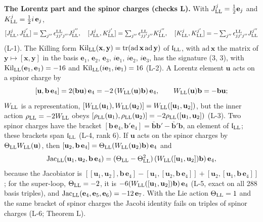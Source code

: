 \documentclass[
  10pt,
]{article}
\begin{document}
\textbf{The Lorentz part and the spinor charges (checks L).} With
\(J^j_{\rm LL}=\tfrac12\mathbf e_j\) and
\(K^j_{\rm LL}=\tfrac12 i\,\mathbf e_j\),
\[[J^j_{\rm LL},J^{j'}_{\rm LL}]=\textstyle\sum_{j''}\epsilon^{\rm LL}_{jj'j''}J^{j''}_{\rm LL},\quad [J^j_{\rm LL},K^{j'}_{\rm LL}]=\textstyle\sum_{j''}\epsilon^{\rm LL}_{jj'j''}K^{j''}_{\rm LL},\quad [K^j_{\rm LL},K^{j'}_{\rm LL}]=-\textstyle\sum_{j''}\epsilon^{\rm LL}_{jj'j''}J^{j''}_{\rm LL}\]
(L-1). The Killing form
\(\mathrm{Kil}_{\rm LL}(\mathbf x,\mathbf y)=\mathrm{tr}(\mathrm{ad}\,\mathbf x\,\mathrm{ad}\,\mathbf y)\)
of \(\mathfrak l_{\rm LL}\), with \(\mathrm{ad}\,\mathbf x\) the matrix
of \(\mathbf y\mapsto[\mathbf x,\mathbf y]\) in the basis
\(\mathbf e_1\), \(\mathbf e_2\), \(\mathbf e_3\), \(i\mathbf e_1\),
\(i\mathbf e_2\), \(i\mathbf e_3\), has the signature (3, 3), with
\(\mathrm{Kil}_{\rm LL}(\mathbf e_1,\mathbf e_1)=-16\) and
\(\mathrm{Kil}_{\rm LL}(i\mathbf e_1,i\mathbf e_1)=16\) (L-2). A Lorentz
element \(\mathbf u\) acts on a spinor charge by
\[[\mathbf u,\mathbf b\,\mathbf e_4]=2(\mathbf b\mathbf u)\,\mathbf e_4=-2\,(W_{\rm LL}(\mathbf u)\mathbf b)\,\mathbf e_4,\qquad W_{\rm LL}(\mathbf u)\mathbf b=-\mathbf b\mathbf u ;\]
\(W_{\rm LL}\) is a representation,
\([W_{\rm LL}(\mathbf u_1),W_{\rm LL}(\mathbf u_2)]=W_{\rm LL}([\mathbf u_1,\mathbf u_2])\),
but the inner action \(\rho_{\rm LL}=-2W_{\rm LL}\) obeys
\([\rho_{\rm LL}(\mathbf u_1),\rho_{\rm LL}(\mathbf u_2)]=-2\rho_{\rm LL}([\mathbf u_1,\mathbf u_2])\)
(L-3). Two spinor charges have the bracket
\([\mathbf b\,\mathbf e_4,\mathbf b'\mathbf e_4]=\bar{\mathbf b}\mathbf b'-\bar{\mathbf b}'\mathbf b\),
an element of \(\mathfrak l_{\rm LL}\); these brackets span
\(\mathfrak l_{\rm LL}\) (L-4, rank 6). If \(\mathbf u\) acts on the
spinor charges by \(\Theta_{\rm LL}W_{\rm LL}(\mathbf u)\), then
\([\mathbf u_2,\mathbf b\,\mathbf e_4]=\Theta_{\rm LL}(W_{\rm LL}(\mathbf u_2)\mathbf b)\,\mathbf e_4\)
and
\[\mathrm{Jac}_{\rm LL}(\mathbf u_1,\mathbf u_2,\mathbf b\,\mathbf e_4)=(\Theta_{\rm LL}-\Theta_{\rm LL}^2)\,(W_{\rm LL}([\mathbf u_1,\mathbf u_2])\mathbf b)\,\mathbf e_4 ,\]
because the Jacobiator is
\([[\mathbf u_1,\mathbf u_2],\mathbf b\,\mathbf e_4]-[\mathbf u_1,[\mathbf u_2,\mathbf b\,\mathbf e_4]]+[\mathbf u_2,[\mathbf u_1,\mathbf b\,\mathbf e_4]]\);
for the super-loop, \(\Theta_{\rm LL}=-2\), it is
\(-6(W_{\rm LL}([\mathbf u_1,\mathbf u_2])\mathbf b)\,\mathbf e_4\)
(L-5, exact on all 288 basis triples), and
\(\mathrm{Jac}_{\rm LL}(\mathbf e_4,\mathbf e_5,\mathbf e_6)=-12\,\mathbf e_7\).
With the Lie action \(\Theta_{\rm LL}=1\) and the same bracket of spinor
charges the Jacobi identity fails on triples of spinor charges (L-6;
Theorem L).
\end{document}
